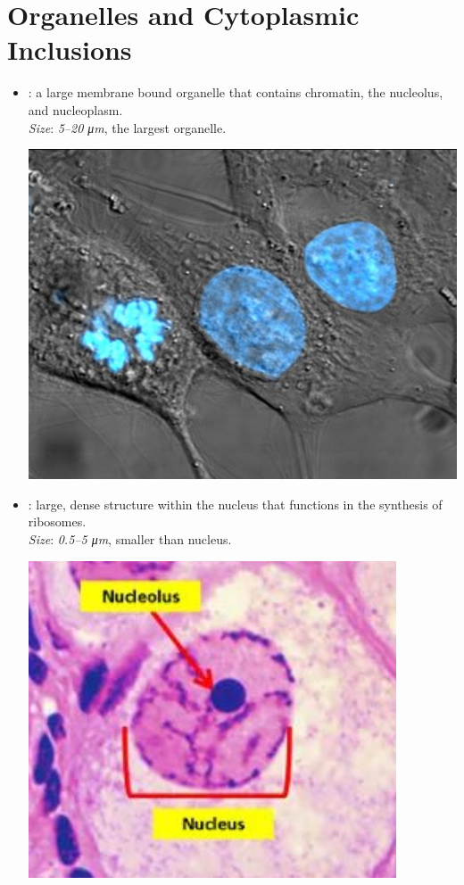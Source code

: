 \section{Organelles and Cytoplasmic Inclusions}
\begin{multicols}{2}
\begin{itemize}
  \item {}: a large membrane bound organelle that contains chromatin, the nucleolus, and nucleoplasm. \\ 
  \textit{Size}: \emph{5--20 \si{\micro m}}, the largest organelle. \\
  \begin{center}
    \hspace{-30pt}\includegraphics[width=0.65\columnwidth]{images/week-1-nucleus.png}
  \end{center}
  \item {}: large, dense structure within the nucleus that functions in the synthesis of ribosomes. \\
  \textit{Size}: \emph{0.5--5 \si{\micro m}}, smaller than nucleus.
  \begin{center}
    \hspace{-30pt}\includegraphics[width=0.65\columnwidth]{images/week-1-nucleolus.png}

\end{center}
\end{itemize}
\end{multicols}
